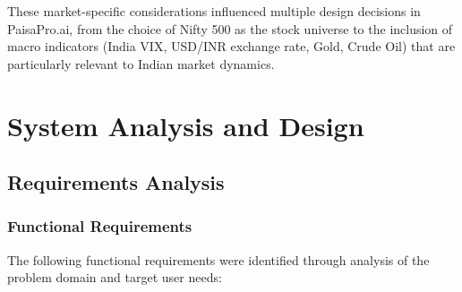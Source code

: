 \documentclass[12pt, a4paper, oneside]{report}
\newcommand{\projectname}{PaisaPro.ai}
\begin{document}
These market-specific considerations influenced multiple design decisions in \projectname{}, from the choice of Nifty 500 as the stock universe to the inclusion of macro indicators (India VIX, USD/INR exchange rate, Gold, Crude Oil) that are particularly relevant to Indian market dynamics.


\chapter{System Analysis and Design}
\label{chap:system_design}

\section{Requirements Analysis}
\label{sec:requirements}

\subsection{Functional Requirements}

The following functional requirements were identified through analysis of the problem domain and target user needs:
\end{document}
